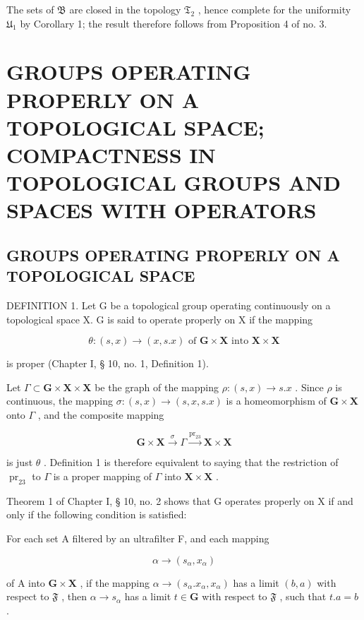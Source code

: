 The sets of \(\mathfrak{B}\) are closed in the topology \(\mathfrak{T}_{2}\) , hence complete for the uniformity \(\mathfrak{U}_{1}\) by Corollary 1; the result therefore follows from Proposition 4 of no. 3.

\section{GROUPS OPERATING PROPERLY ON A TOPOLOGICAL SPACE; COMPACTNESS IN TOPOLOGICAL GROUPS AND SPACES WITH OPERATORS}

\subsection{GROUPS OPERATING PROPERLY ON A TOPOLOGICAL SPACE}

DEFINITION 1. Let G be a topological group operating continuously on a topological space X. G is said to operate properly on X if the mapping

\[
\theta : (s, x) \rightarrow (x, s. x) \text{ of } \mathbf{G} \times \mathbf{X} \text{ into } \mathbf{X} \times \mathbf{X}
\]

is proper (Chapter I, § 10, no. 1, Definition 1).

Let \(\Gamma \subset \mathbf{G} \times \mathbf{X} \times \mathbf{X}\) be the graph of the mapping \(\rho: (s, x) \to s.x\) . Since \(\rho\) is continuous, the mapping \(\sigma: (s, x) \to (s, x, s.x)\) is a homeomorphism of \(\mathbf{G} \times \mathbf{X}\) onto \(\Gamma\) , and the composite mapping

\[
\mathbf {G} \times \mathbf {X} \xrightarrow {\sigma} \Gamma \xrightarrow {\mathrm{pr} _ {2 3}} \mathbf {X} \times \mathbf {X}
\]

is just \(\theta\) . Definition 1 is therefore equivalent to saying that the restriction of \(\operatorname{pr}_{23}\) to \(\Gamma\) is a proper mapping of \(\Gamma\) into \(\mathbf{X} \times \mathbf{X}\) .

Theorem 1 of Chapter I, § 10, no. 2 shows that G operates properly on X if and only if the following condition is satisfied:

For each set A filtered by an ultrafilter F, and each mapping

\[
\alpha \rightarrow (s _ {\alpha}, x _ {\alpha})
\]

of A into \(\mathbf{G} \times \mathbf{X}\) , if the mapping \(\alpha \to (s_{\alpha}.x_{\alpha}, x_{\alpha})\) has a limit \((b, a)\) with respect to \(\mathfrak{F}\) , then \(\alpha \to s_{\alpha}\) has a limit \(t \in \mathbf{G}\) with respect to \(\mathfrak{F}\) , such that \(t.a = b\) .

